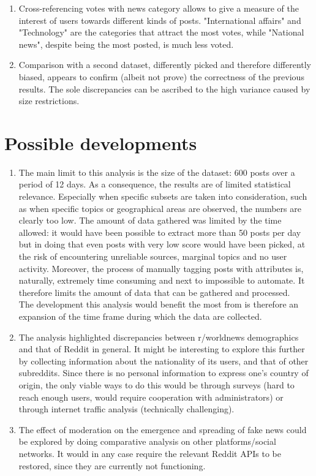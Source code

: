 \documentclass{article}
\begin{document}
\begin{enumerate}
\item Cross-referencing votes with news category allows to give a measure of the interest of users towards different kinds of posts. "International affairs" and "Technology" are the categories that attract the most votes, while "National news", despite being the most posted, is much less voted.
\item Comparison with a second dataset, differently picked and therefore differently biased, appears to confirm (albeit not prove) the correctness of the previous results. The sole discrepancies can be ascribed to the high variance caused by size restrictions.
\end{enumerate}

\pagebreak
\section{Possible developments}
\begin{enumerate}
\item The main limit to this analysis is the size of the dataset: 600 posts over a period of 12 days. As a consequence, the results are of limited statistical relevance. Especially when specific subsets are taken into consideration, such as when specific topics or geographical areas are observed, the numbers are clearly too low. The amount of data gathered was limited by the time allowed: it would have been possible to extract more than 50 posts per day but in doing that even posts with very low score would have been picked, at the risk of encountering unreliable sources, marginal topics and no user activity.
Moreover, the process of manually tagging posts with attributes is, naturally, extremely time consuming and next to impossible to automate. It therefore limits the amount of data that can be gathered and processed.\\
The development this analysis would benefit the most from is therefore an expansion of the time frame during which the data are collected.
\item The analysis highlighted discrepancies between r/worldnews demographics and that of Reddit in general. It might be interesting to explore this further by collecting information about the nationality of its users, and that of other subreddits. Since there is no personal information to express one's country of origin, the only viable ways to do this would be through surveys (hard to reach enough users, would require cooperation with administrators) or through internet traffic analysis (technically challenging).
\item The effect of moderation on the emergence and spreading of fake news could be explored by doing comparative analysis on other platforms/social networks. It would in any case require the relevant Reddit APIs to be restored, since they are currently not functioning.
\end{enumerate}






\end{document}
